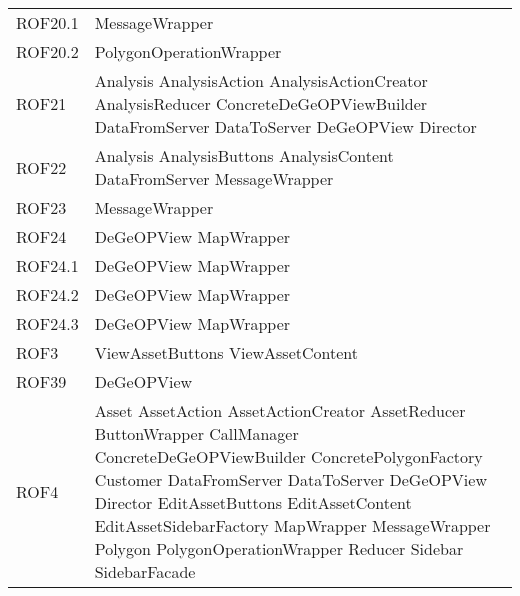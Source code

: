 \begin{longtable}{p{2.5cm}!{\VRule[1pt]}p{5cm}}
		ROF20.1 & MessageWrapper\\
		ROF20.2 & PolygonOperationWrapper\\
		ROF21 & Analysis \newline AnalysisAction \newline AnalysisActionCreator \newline AnalysisReducer \newline ConcreteDeGeOPViewBuilder \newline DataFromServer \newline DataToServer \newline DeGeOPView \newline Director\\
		ROF22 & Analysis \newline AnalysisButtons \newline AnalysisContent \newline DataFromServer \newline MessageWrapper\\
		ROF23 & MessageWrapper\\
		ROF24 & DeGeOPView \newline MapWrapper\\
		ROF24.1 & DeGeOPView \newline MapWrapper\\
		ROF24.2 & DeGeOPView \newline MapWrapper\\
		ROF24.3 & DeGeOPView \newline MapWrapper\\
		ROF3 & ViewAssetButtons \newline ViewAssetContent\\
		ROF39 & DeGeOPView\\
		ROF4 & Asset \newline AssetAction \newline AssetActionCreator \newline AssetReducer \newline ButtonWrapper \newline CallManager \newline ConcreteDeGeOPViewBuilder \newline ConcretePolygonFactory \newline Customer \newline DataFromServer \newline DataToServer \newline DeGeOPView \newline Director \newline EditAssetButtons \newline EditAssetContent \newline EditAssetSidebarFactory \newline MapWrapper \newline MessageWrapper \newline Polygon \newline PolygonOperationWrapper \newline Reducer \newline Sidebar \newline SidebarFacade\\

\end{longtable}
